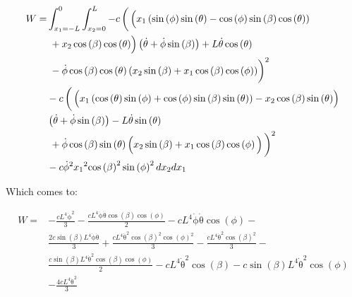 \begin{equation}
    \begin{split}
        W = &\int_{x_1 = -L}^0\int_{x_2 = 0}^L-c\left(\vphantom{\int}\left(\vphantom{\sum}x_{1}\left(\sin\left(\phi \right)\sin\left(\theta \right)-\cos\left(\phi \right)\sin\left(\beta \right)\cos\left(\theta \right)\right)\right.\right.\\
        &\left.\vphantom{\sum}+x_{2}\cos\left(\beta \right)\cos\left(\theta \right)\right)\left(\mathrm{\dot\theta}+\mathrm{\dot\phi}\sin\left(\beta \right)\right)+L\mathrm{\dot\theta}\cos\left(\theta \right)\\
        &\left.\vphantom{\int}-\mathrm{\dot\phi}\cos\left(\beta \right)\cos\left(\theta \right)\left(x_{2}\sin\left(\beta \right)+x_{1}\cos\left(\beta \right)\cos\left(\phi \right)\right)\right)^2\\
        &-c\left(\vphantom{\int}\left(\vphantom{\sum}x_{1}\left(\cos\left(\theta \right)\sin\left(\phi \right)+\cos\left(\phi \right)\sin\left(\beta \right)\sin\left(\theta \right)\right)-x_{2}\cos\left(\beta \right)\sin\left(\theta \right)\right)\right.\\
&\left(\mathrm{\dot\theta}+\mathrm{\dot\phi}\sin\left(\beta \right)\right)-L\mathrm{\dot\theta}\sin\left(\theta \right)\\
&\left.\vphantom{\sum}+\mathrm{\dot\phi}\cos\left(\beta \right)\sin\left(\theta \right)\left(x_{2}\sin\left(\beta \right)+x_{1}\cos\left(\beta \right)\cos\left(\phi \right)\vphantom{\sum}\right)\vphantom{\int}\right)^2\\
&-c{\mathrm{\dot\phi}}^2{x_{1}}^2{\cos\left(\beta \right)}^2\sin\left(\phi \right)^2dx_2dx_1
    \end{split}
\end{equation}

Which comes to:

\begin{equation}
    \begin{split}
        W = &-\frac{cL^4{\mathrm{\dot\phi}}^2}{3}-\frac{cL^4\mathrm{\dot\phi}\mathrm{\dot\theta}\cos\left(\beta \right)\cos\left(\phi \right)}{2}-cL^4\mathrm{\dot\phi}\mathrm{\dot\theta}\cos\left(\phi \right)-\\
        &\frac{2c\sin\left(\beta \right)L^4\mathrm{\dot\phi}\mathrm{\dot\theta}}{3}+\frac{cL^4{\mathrm{\dot\theta}}^2{\cos\left(\beta \right)}^2{\cos\left(\phi \right)}^2}{3}-\frac{cL^4{\mathrm{\dot\theta}}^2{\cos\left(\beta \right)}^2}{3}-\\
        &\frac{c\sin\left(\beta \right)L^4{\mathrm{\dot\theta}}^2\cos\left(\beta \right)\cos\left(\phi \right)}{2}-cL^4{\mathrm{\dot\theta}}^2\cos\left(\beta \right)-c\sin\left(\beta \right)L^4{\mathrm{\dot\theta}}^2\cos\left(\phi \right)\\
        &-\frac{4cL^4{\mathrm{\dot\theta}}^2}{3}
    \end{split}
\end{equation}

